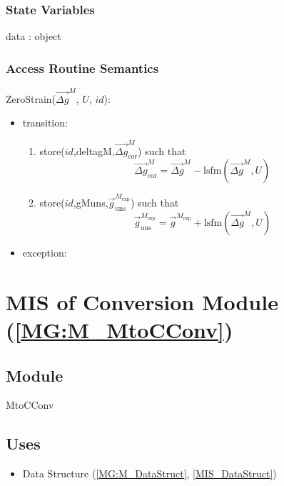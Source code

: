 \documentclass[12pt, titlepage]{article}
\begin{document}
\subsubsection{State Variables}

data : object

\subsubsection{Access Routine Semantics}

\noindent ZeroStrain($\overrightarrow{\Delta g}^M$, $U$, $id$):
\begin{itemize}  
\item transition:
	\begin{enumerate}
	\item store($id$,deltagM,$\overrightarrow{\Delta g}_{\text{cor}}^M$) such that
	\begin{equation*}
\overrightarrow{\Delta g}_{\text{cor}}^M = \overrightarrow{\Delta g}^M - \text{lsfm}(\overrightarrow{\Delta g}^M,U)
	\end{equation*}
	\item store($id$,gMuns,$\overrightarrow{g}_{\text{uns}}^{M_{\text{exp}}}$) such that
	\begin{equation*}
\overrightarrow{g}_{\text{uns}}^{M_{\text{exp}}} = \overrightarrow{g}^{M_{\text{exp}}} + \text{lsfm}(\overrightarrow{\Delta g}^M,U)
	\end{equation*}
	\end{enumerate}	 
\item exception: 
\end{itemize}

\section{MIS of Conversion Module (\texorpdfstring{\cref{MG:M_MtoCConv}}))} \label{MIS_MtoCConv}

\subsection{Module}
MtoCConv
\subsection{Uses}
\begin{itemize}
\item Data Structure (\cref{MG:M_DataStruct}, \cref{MIS_DataStruct})
\end{itemize}
\end{document}
